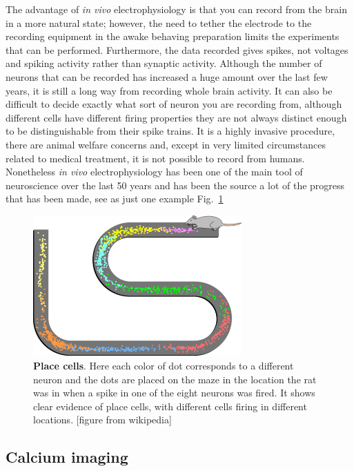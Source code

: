 \documentclass[12pt]{article}
\begin{document}
The advantage of \textsl{in vivo} electrophysiology is that you can
record from the brain in a more natural state; however, the need to
tether the electrode to the recording equipment in the awake behaving
preparation limits the experiments that can be performed. Furthermore,
the data recorded gives spikes, not voltages and spiking activity
rather than synaptic activity. Although the number of neurons that can
be recorded has increased a huge amount over the last few years, it is
still a long way from recording whole brain activity. It can also be
difficult to decide exactly what sort of neuron you are recording
from, although different cells have different firing properties they
are not always distinct enough to be distinguishable from their spike
trains. It is a highly invasive procedure, there are animal welfare
concerns and, except in very limited circumstances related to medical
treatment, it is not possible to record from humans. Nonetheless
\textsl{in vivo} electrophysiology has been one of the main tool of
neuroscience over the last 50 years and has been the source a lot of
the progress that has been made, see as just one example
Fig.~\ref{fig:place}


\begin{figure}
  \begin{center}
    \includegraphics[width=8cm]{place_cells.png}
    \end{center}
  \caption{\textbf{Place cells}. Here each color of dot corresponds to a different neuron and the dots are placed on the maze in the location the rat was in when a spike in one of the eight neurons was fired. It shows clear evidence of place cells, with different cells firing in different locations. [figure from wikipedia]\label{fig:place}}
\end{figure}

\subsection*{Calcium imaging}
\end{document}
